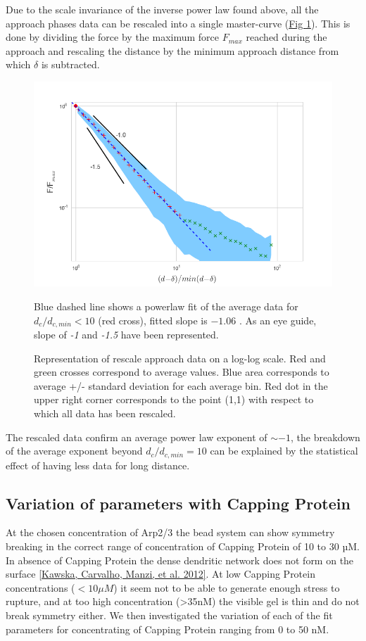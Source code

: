 \documentclass[A4paperpaper,11pt,english]{sphinxmanual}
\begin{document}
Due to the scale invariance of the inverse power law found above,  all the
approach phases data can be rescaled into a single master-curve (\hyperref[index-latex:fig-rescale-powerlaw]{Fig  \ref*{index-latex:fig-rescale-powerlaw}}). This is done
by dividing the force by the maximum force \(F_{max}\) reached during the
approach and rescaling the distance by the minimum approach distance from which
\(\delta\) is subtracted.
\begin{figure}[htbp]
\centering
\capstart

\includegraphics[width=0.700\linewidth]{rescaled_powerlaw.png}
\caption{Representation of rescale approach data on a log-log scale.  Red and green
crosses correspond to average values. Blue area corresponds to average +/-
standard deviation for each average bin. Red dot in the upper right corner
corresponds to the point (1,1) with respect to which all data has been
rescaled.}{\small 
Blue dashed line shows a powerlaw fit of the average data for
\(d_c/d_{c,min} < 10\) (red cross), fitted slope is \(-1.06\) .
As an eye guide, slope of \emph{-1} and \emph{-1.5} have been represented.
}\label{index-latex:fig-rescale-powerlaw}\end{figure}

The rescaled data confirm an average power law exponent of \(\sim -1\), the
breakdown of the average exponent beyond \(d_c/d_{c,min}=10\) can be
explained by the statistical effect of having less data for long distance.


\subsection{Variation of parameters with Capping Protein}
\label{index-latex:variation-of-parameters-with-capping-protein}
At the chosen concentration of Arp2/3 the bead system can show symmetry
breaking in the correct range of concentration of Capping Protein of 10 to 30
µM. In absence of Capping Protein the dense dendritic network does not form on
the surface {\hyperref[index-latex:kawska2012]{{[}Kawska, Carvalho, Manzi,  et al.  2012{]}}}. At low Capping Protein concentrations (\(<10 \mu{}M\)) it seem not to be able to generate enough stress to
rupture, and at too high concentration (\textgreater{}35nM) the visible gel is thin and do
not break symmetry either. We then investigated the variation of each of the
fit parameters for concentrating of Capping Protein ranging from 0 to 50 nM.
\end{document}
